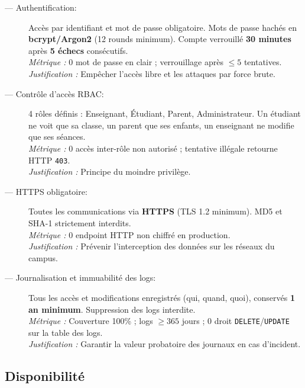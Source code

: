 \begin{description}

    \item[ — Authentification:]
    Accès par identifiant et mot de passe obligatoire. Mots de passe
    hachés en \textbf{bcrypt/Argon2} (12 rounds minimum). Compte verrouillé
    \textbf{30 minutes} après \textbf{5 échecs} consécutifs.\\
    \textit{Métrique :} 0 mot de passe en clair ;
    verrouillage après $\leq 5$ tentatives.\\
    \textit{Justification :} Empêcher l'accès libre et les attaques
    par force brute.

    \item[ — Contrôle d'accès RBAC:]
    4 rôles définis : Enseignant, Étudiant, Parent, Administrateur.
    Un étudiant ne voit que sa classe, un parent que ses enfants,
    un enseignant ne modifie que ses séances.\\
    \textit{Métrique :} 0 accès inter-rôle non autorisé ;
    tentative illégale retourne HTTP \texttt{403}.\\
    \textit{Justification :} Principe du moindre privilège.

    \item[ — HTTPS obligatoire:]
    Toutes les communications via \textbf{HTTPS} (TLS 1.2 minimum).
    MD5 et SHA-1 strictement interdits.\\
    \textit{Métrique :} 0 endpoint HTTP non chiffré en production.\\
    \textit{Justification :} Prévenir l'interception des données
    sur les réseaux du campus.

    \item[ — Journalisation et immuabilité des logs:]
    Tous les accès et modifications enregistrés (qui, quand, quoi),
    conservés \textbf{1 an minimum}. Suppression des logs interdite.\\
    \textit{Métrique :} Couverture 100\% ; logs $\geq 365$ jours ;
    0 droit \texttt{DELETE}/\texttt{UPDATE} sur la table des logs.\\
    \textit{Justification :} Garantir la valeur probatoire des journaux
    en cas d'incident.

\end{description}

\subsection{Disponibilité}


